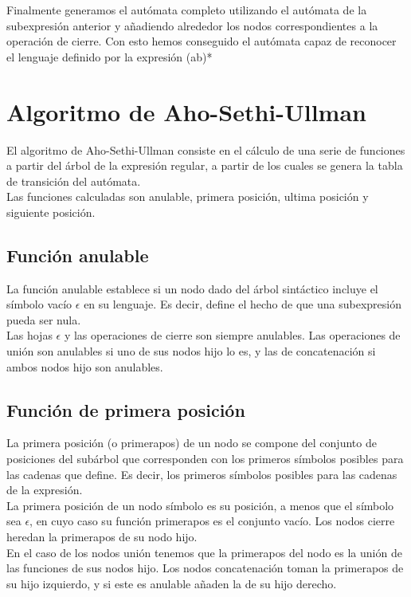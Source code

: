 
Finalmente generamos el autómata completo utilizando el autómata de la subexpresión anterior y añadiendo alrededor los nodos correspondientes a la operación de cierre.
Con esto hemos conseguido el autómata capaz de reconocer el lenguaje definido por la expresión (a\textbar b)*


\section{Algoritmo de Aho-Sethi-Ullman}
El algoritmo de Aho-Sethi-Ullman \cite{dragon} consiste en el cálculo de una serie de funciones a partir del árbol de la expresión regular, a partir de los cuales se genera la tabla de transición del autómata.
\\
Las funciones calculadas son anulable, primera posición, ultima posición y siguiente posición.

\subsection{Función anulable}
La función anulable establece si un nodo dado del árbol sintáctico incluye el símbolo vacío $ \epsilon $ en su lenguaje.
Es decir, define el hecho de que una subexpresión pueda ser nula.
\\
Las hojas $ \epsilon $ y las operaciones de cierre son siempre anulables.
Las operaciones de unión son anulables si uno de sus nodos hijo lo es, y las de concatenación si ambos nodos hijo son anulables.

\subsection{Función de primera posición}
La primera posición (o primerapos) de un nodo se compone del conjunto de posiciones del subárbol que corresponden con los primeros símbolos posibles para las cadenas que define.
Es decir, los primeros símbolos posibles para las cadenas de la expresión.
\\
La primera posición de un nodo símbolo es su posición, a menos que el símbolo sea $ \epsilon $, en cuyo caso su función primerapos es el conjunto vacío.
Los nodos cierre heredan la primerapos de su nodo hijo.
\\
En el caso de los nodos unión tenemos que la primerapos del nodo es la unión de las funciones de sus nodos hijo.
Los nodos concatenación toman la primerapos de su hijo izquierdo, y si este es anulable añaden la de su hijo derecho.

